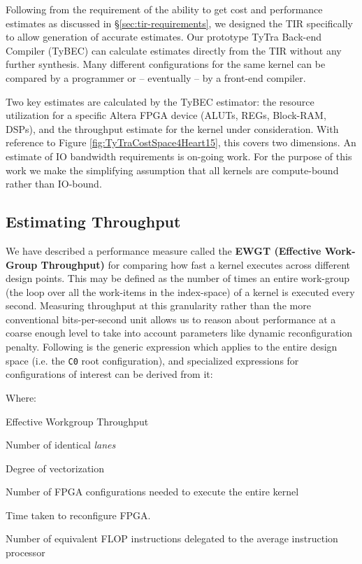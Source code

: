 \documentclass[]{heart2015_WN4Pre}
\begin{document}
Following from the requirement of the ability to get cost and performance estimates as discussed in \S\ref{sec:tir-requirements}, we  designed the TIR  specifically to allow generation of accurate estimates. Our prototype TyTra Back-end Compiler (TyBEC) can calculate estimates directly from the TIR without any further synthesis. Many different configurations for the same kernel can be compared by a programmer or -- eventually -- by a front-end compiler.

Two key estimates are calculated by the TyBEC estimator: the resource utilization for a specific Altera FPGA device (ALUTs, REGs, Block-RAM, DSPs), and the throughput estimate for the kernel under consideration. With reference to Figure \ref{fig:TyTraCostSpace4Heart15}, this covers two dimensions. An estimate of IO bandwidth requirements is on-going work. For the purpose of this work we make the simplifying assumption that all kernels are compute-bound rather than IO-bound. 

\subsection{Estimating Throughput}

We have described a performance measure called the \textbf{EWGT (Effective Work-Group Throughput)} for comparing how fast a kernel executes across different design points. This may be defined as the number of times an entire work-group (the loop over all the work-items in the index-space) of a kernel is executed every second. Measuring throughput at this granularity rather than the more conventional bits-per-second unit allows us to reason about performance at a coarse enough level to take into account parameters like dynamic reconfiguration penalty. Following is the generic expression which applies to the entire design space (i.e. the \texttt{C0} root configuration), and specialized expressions for configurations of interest can be derived from it:



Where:

{} Effective Workgroup Throughput

{} Number of identical \emph{lanes} 

{} Degree of vectorization 

{} Number of FPGA configurations needed to execute the entire kernel 

{} Time taken to reconfigure FPGA.

{} Number of equivalent FLOP instructions delegated to the average instruction processor
\end{document}
